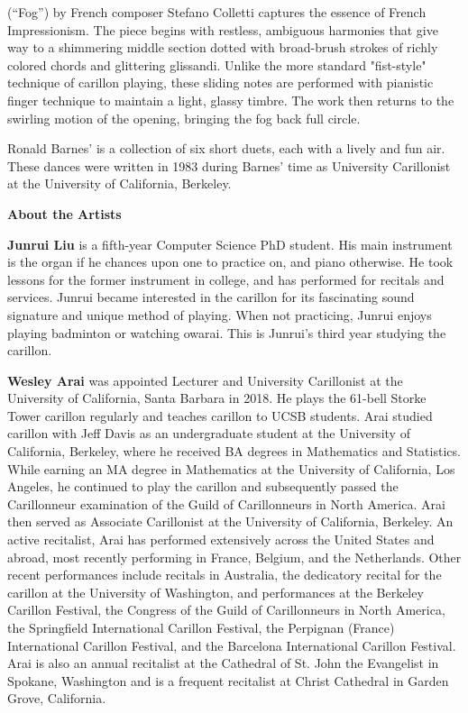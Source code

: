 \documentclass[11pt, letterpaper]{article}
\begin{document}
\begin{small}
     (``Fog'') by French composer Stefano Colletti captures the essence of French Impressionism. The piece begins with restless, ambiguous harmonies that give way to a shimmering middle section dotted with broad-brush strokes of richly colored chords and glittering glissandi. Unlike the more standard "fist-style" technique of carillon playing, these sliding notes are performed with pianistic finger technique to maintain a light, glassy timbre. The work then returns to the swirling motion of the opening, bringing the fog back full circle.

    Ronald Barnes'  is a collection of six short duets, each with a lively and fun air. These dances were written in 1983 during Barnes' time as University Carillonist at the University of California, Berkeley.
\end{small}

\vfill

\textbf{About the Artists}

\begin{small}

    \textbf{Junrui Liu} is a fifth-year Computer Science PhD student. His main instrument is the organ if he chances upon one to practice on, and piano otherwise. He took lessons for the former instrument in college, and has performed for recitals and services. Junrui became interested in the carillon for its fascinating sound signature and unique method of playing. When not practicing, Junrui enjoys playing badminton or watching owarai. This is Junrui's third year studying the carillon.

    \vspace{1em}

    \textbf{Wesley Arai} was appointed Lecturer and University Carillonist at the University of California, Santa Barbara in 2018. He plays the 61-bell Storke Tower carillon regularly and teaches carillon to UCSB students. Arai studied carillon with Jeff Davis as an undergraduate student at the University of California, Berkeley, where he received BA degrees in Mathematics and Statistics. While earning an MA degree in Mathematics at the University of California, Los Angeles, he continued to play the carillon and subsequently passed the Carillonneur examination of the Guild of Carillonneurs in North America. Arai then served as Associate Carillonist at the University of California, Berkeley. An active recitalist, Arai has performed extensively across the United States and abroad, most recently performing in France, Belgium, and the Netherlands. Other recent performances include recitals in Australia, the dedicatory recital for the carillon at the University of Washington, and performances at the Berkeley Carillon Festival, the Congress of the Guild of Carillonneurs in North America, the Springfield International Carillon Festival, the Perpignan (France) International Carillon Festival, and the Barcelona International Carillon Festival. Arai is also an annual recitalist at the Cathedral of St. John the Evangelist in Spokane, Washington and is a frequent recitalist at Christ Cathedral in Garden Grove, California.

\end{small}
\end{document}
